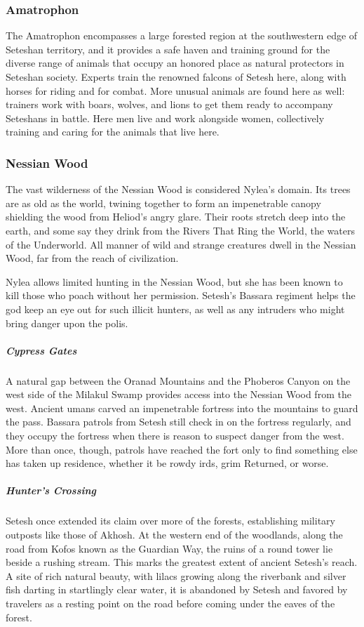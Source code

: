     \subsubsection{Amatrophon}
        The Amatrophon encompasses a large forested region at the southwestern edge of Seteshan territory, and it provides a safe haven and training ground for the diverse range of animals that occupy an honored place as natural protectors in Seteshan society.
        Experts train the renowned falcons of Setesh here, along with horses for riding and for combat.
        More unusual animals are found here as well: trainers work with boars, wolves, and lions to get them ready to accompany Seteshans in battle.
        Here men live and work alongside women, collectively training and caring for the animals that live here.

    \subsubsection{Nessian Wood}
        The vast wilderness of the Nessian Wood is considered Nylea's domain.
        Its trees are as old as the world, twining together to form an impenetrable canopy shielding the wood from Heliod's angry glare.
        Their roots stretch deep into the earth, and some say they drink from the Rivers That Ring the World, the waters of the Underworld.
        All manner of wild and strange creatures dwell in the Nessian Wood, far from the reach of civilization.

        Nylea allows limited hunting in the Nessian Wood, but she has been known to kill those who poach without her permission.
        Setesh's Bassara regiment helps the god keep an eye out for such illicit hunters, as well as any intruders who might bring danger upon the polis.

        \subparagraph{Cypress Gates} A natural gap between the Oranad Mountains and the Phoberos Canyon on the west side of the Milakul Swamp provides access into the Nessian Wood from the west.
        Ancient umans carved an impenetrable fortress into the mountains to guard the pass.
        Bassara patrols from Setesh still check in on the fortress regularly, and they occupy the fortress when there is reason to suspect danger from the west.
        More than once, though, patrols have reached the fort only to find something else has taken up residence, whether it be rowdy irds, grim Returned, or worse.

        \subparagraph{Hunter's Crossing} Setesh once extended its claim over more of the forests, establishing military outposts like those of Akhosh.
        At the western end of the woodlands, along the road from Kofos known as the Guardian Way, the ruins of a round tower lie beside a rushing stream.
        This marks the greatest extent of ancient Setesh's reach.
        A site of rich natural beauty, with lilacs growing along the riverbank and silver fish darting in startlingly clear water, it is abandoned by Setesh and favored by travelers as a resting point on the road before coming under the eaves of the forest.

